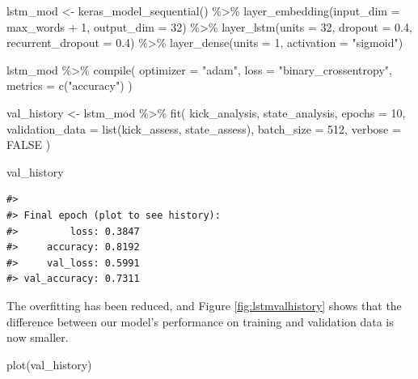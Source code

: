 \documentclass[
]{krantz}
\makeatletter
\newenvironment{Shaded}{\begin{snugshade}}{\end{snugshade}}
\newcommand{\AttributeTok}[1]{\textcolor[rgb]{0.77,0.63,0.00}{#1}}
\newcommand{\ConstantTok}[1]{\textcolor[rgb]{0.00,0.00,0.00}{#1}}
\newcommand{\DecValTok}[1]{\textcolor[rgb]{0.00,0.00,0.81}{#1}}
\newcommand{\FloatTok}[1]{\textcolor[rgb]{0.00,0.00,0.81}{#1}}
\newcommand{\FunctionTok}[1]{\textcolor[rgb]{0.00,0.00,0.00}{#1}}
\newcommand{\NormalTok}[1]{#1}
\newcommand{\OtherTok}[1]{\textcolor[rgb]{0.56,0.35,0.01}{#1}}
\newcommand{\SpecialCharTok}[1]{\textcolor[rgb]{0.00,0.00,0.00}{#1}}
\newcommand{\StringTok}[1]{\textcolor[rgb]{0.31,0.60,0.02}{#1}}
\newenvironment{kframe}{%
\medskip{}
\setlength{\fboxsep}{.8em}
 \def\at@end@of@kframe{}%
 \ifinner\ifhmode%
  \def\at@end@of@kframe{\end{minipage}}%
  \begin{minipage}{\columnwidth}%
 \fi\fi%
 \def\FrameCommand##1{\hskip\@totalleftmargin \hskip-\fboxsep
 \colorbox{shadecolor}{##1}\hskip-\fboxsep
     \hskip-\linewidth \hskip-\@totalleftmargin \hskip\columnwidth}%
 \MakeFramed {\advance\hsize-\width
   \@totalleftmargin\z@ \linewidth\hsize
   \@setminipage}}%
 {\par\unskip\endMakeFramed%
 \at@end@of@kframe}
\renewenvironment{Shaded}{\begin{kframe}}{\end{kframe}}
\makeatother
\begin{document}
\begin{Shaded}
\begin{Highlighting}[]
\NormalTok{lstm\_mod }\OtherTok{\textless{}{-}} \FunctionTok{keras\_model\_sequential}\NormalTok{() }\SpecialCharTok{\%\textgreater{}\%}
  \FunctionTok{layer\_embedding}\NormalTok{(}\AttributeTok{input\_dim =}\NormalTok{ max\_words }\SpecialCharTok{+} \DecValTok{1}\NormalTok{, }\AttributeTok{output\_dim =} \DecValTok{32}\NormalTok{) }\SpecialCharTok{\%\textgreater{}\%}
  \FunctionTok{layer\_lstm}\NormalTok{(}\AttributeTok{units =} \DecValTok{32}\NormalTok{, }\AttributeTok{dropout =} \FloatTok{0.4}\NormalTok{, }\AttributeTok{recurrent\_dropout =} \FloatTok{0.4}\NormalTok{) }\SpecialCharTok{\%\textgreater{}\%}
  \FunctionTok{layer\_dense}\NormalTok{(}\AttributeTok{units =} \DecValTok{1}\NormalTok{, }\AttributeTok{activation =} \StringTok{"sigmoid"}\NormalTok{)}

\NormalTok{lstm\_mod }\SpecialCharTok{\%\textgreater{}\%}
  \FunctionTok{compile}\NormalTok{(}
    \AttributeTok{optimizer =} \StringTok{"adam"}\NormalTok{,}
    \AttributeTok{loss =} \StringTok{"binary\_crossentropy"}\NormalTok{,}
    \AttributeTok{metrics =} \FunctionTok{c}\NormalTok{(}\StringTok{"accuracy"}\NormalTok{)}
\NormalTok{  )}

\NormalTok{val\_history }\OtherTok{\textless{}{-}}\NormalTok{ lstm\_mod }\SpecialCharTok{\%\textgreater{}\%}
  \FunctionTok{fit}\NormalTok{(}
\NormalTok{    kick\_analysis,}
\NormalTok{    state\_analysis,}
    \AttributeTok{epochs =} \DecValTok{10}\NormalTok{,}
    \AttributeTok{validation\_data =} \FunctionTok{list}\NormalTok{(kick\_assess, state\_assess),}
    \AttributeTok{batch\_size =} \DecValTok{512}\NormalTok{,}
    \AttributeTok{verbose =} \ConstantTok{FALSE}
\NormalTok{  )}

\NormalTok{val\_history}
\end{Highlighting}
\end{Shaded}

\begin{verbatim}
#> 
#> Final epoch (plot to see history):
#>         loss: 0.3847
#>     accuracy: 0.8192
#>     val_loss: 0.5991
#> val_accuracy: 0.7311
\end{verbatim}

The overfitting has been reduced, and Figure \ref{fig:lstmvalhistory} shows that the difference between our model's performance on training and validation data is now smaller.

\begin{Shaded}
\begin{Highlighting}[]
\FunctionTok{plot}\NormalTok{(val\_history)}
\end{Highlighting}
\end{Shaded}
\end{document}
